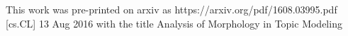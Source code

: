 \documentclass[11pt,letterpaper]{article}
\begin{document}
This work was pre-printed on arxiv as https://arxiv.org/pdf/1608.03995.pdf [cs.CL] 13 Aug 2016 with the title Analysis of Morphology in Topic Modeling
\end{document}
